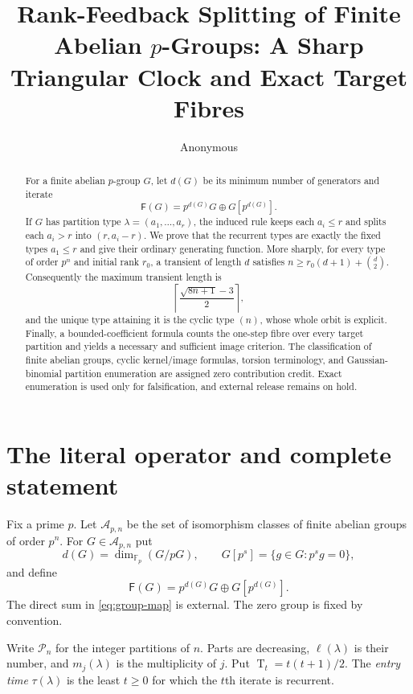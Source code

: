 \documentclass[10pt,a4paper]{amsart}
\title[Rank-feedback splitting]{Rank-Feedback Splitting of Finite Abelian
$p$-Groups: A Sharp Triangular Clock and Exact Target Fibres}
\author{Anonymous}
\date{}
\theoremstyle{definition}
\theoremstyle{remark}
\newcommand{\Part}{\mathcal P}
\newcommand{\RF}{\mathsf F}
\newcommand{\len}{\ell}
\newcommand{\T}{\operatorname T}
\begin{document}
\begin{abstract}
For a finite abelian $p$-group $G$, let $d(G)$ be its minimum number of
generators and iterate
\[
                 \RF(G)=p^{d(G)}G\oplus G[p^{d(G)}].
\]
If $G$ has partition type $\lambda=(a_1,\ldots,a_r)$, the induced rule keeps
each $a_i\leq r$ and splits each $a_i>r$ into $(r,a_i-r)$.  We prove that
the recurrent types are exactly the fixed types $a_1\leq r$ and give their
ordinary generating function.  More sharply, for every type of order $p^n$
and initial rank $r_0$, a transient of length $d$ satisfies
$n\geq r_0(d+1)+\binom d2$.  Consequently the maximum transient length is
\[
 \left\lceil\frac{\sqrt{8n+1}-3}{2}\right\rceil,
\]
and the unique type attaining it is the cyclic type $(n)$, whose whole orbit
is explicit.  Finally, a bounded-coefficient formula counts the one-step
fibre over every target partition and yields a necessary and sufficient
image criterion.  The classification of finite abelian groups, cyclic
kernel/image formulas, torsion terminology, and Gaussian-binomial partition
enumeration are assigned zero contribution credit.  Exact enumeration is
used only for falsification, and external release remains on hold.
\end{abstract}

\maketitle

\section{The literal operator and complete statement}

Fix a prime $p$.  Let $\mathcal A_{p,n}$ be the set of isomorphism classes
of finite abelian groups of order $p^n$.  For $G\in\mathcal A_{p,n}$ put
\[
 d(G)=\dim_{\mathbb F_p}(G/pG),\qquad
 G[p^s]=\{g\in G:p^sg=0\},
\]
and define
\begin{equation}\label{eq:group-map}
                      \RF(G)=p^{d(G)}G\oplus G[p^{d(G)}].
\end{equation}
The direct sum in \eqref{eq:group-map} is external.  The zero group is fixed
by convention.

Write $\Part_n$ for the integer partitions of $n$.  Parts are decreasing,
$\len(\lambda)$ is their number, and $m_j(\lambda)$ is the multiplicity of
$j$.  Put $\T_t=t(t+1)/2$.  The \emph{entry time} $\tau(\lambda)$ is the
least $t\geq0$ for which the $t$th iterate is recurrent.
\end{document}
